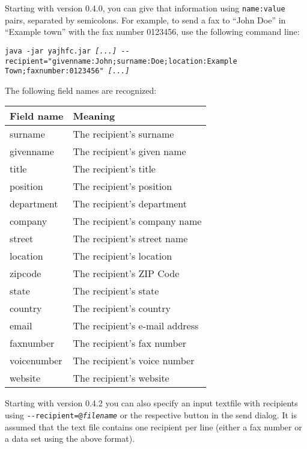\documentclass[a4paper,10pt]{scrartcl}
\begin{document}
Starting with version 0.4.0, you can give that information using \texttt{name:value} pairs, separated by semicolons. For example, to send a fax to ``John Doe'' in ``Example town'' with the fax number 0123456, use the following command line:

\texttt{java -jar yajhfc.jar \textit{[...]} -{-}recipient="givenname:John;surname:Doe;location:Example Town;faxnumber:0123456" \textit{[...]}}

The following field names are recognized:
\begin{center}
\begin{tabular}{|l|p{}|}
\hline
\bfseries Field name & \bfseries Meaning \\
\hline\hline
\ttfamily surname & The recipient's surname\\\hline
\ttfamily givenname & The recipient's given name \\\hline
\ttfamily title & The recipient's title \\\hline
\ttfamily position & The recipient's position \\\hline
\ttfamily department & The recipient's department\\\hline
\ttfamily company & The recipient's company name\\\hline
\ttfamily street & The recipient's street name \\\hline
\ttfamily location & The recipient's location\\\hline
\ttfamily zipcode & The recipient's ZIP Code \\\hline
\ttfamily state & The recipient's state\\\hline
\ttfamily country & The recipient's country\\\hline
\ttfamily email & The recipient's e-mail address\\\hline
\ttfamily faxnumber & The recipient's fax number \\\hline
\ttfamily voicenumber & The recipient's voice number \\\hline
\ttfamily website & The recipient's website\\\hline
\end{tabular}
\end{center}

Starting with version 0.4.2 you can also specify an input textfile with recipients using \texttt{-{-}recipient=@\textit{filename}} or the respective button in the send dialog.
It is assumed that the text file contains one recipient per line (either a fax number or a data set using the above format).
\end{document}
